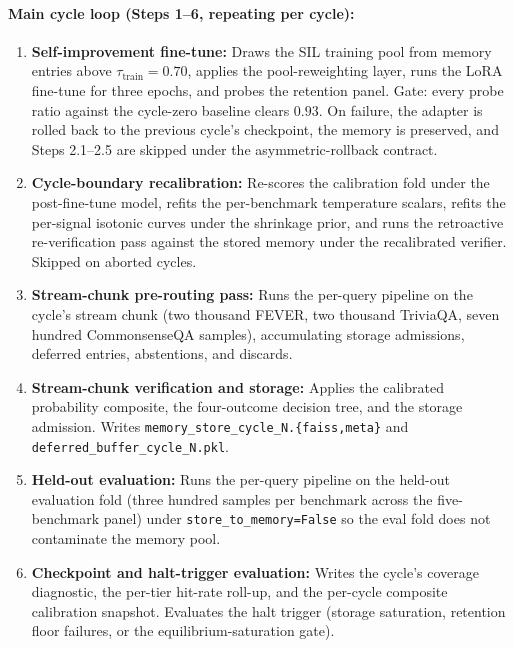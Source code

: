 \paragraph{Main cycle loop (Steps 1--6, repeating per cycle):}
\begin{enumerate}
\item \textbf{Self-improvement fine-tune:} Draws the SIL training pool from memory entries above $\tau_{\text{train}} = 0.70$, applies the pool-reweighting layer, runs the LoRA fine-tune for three epochs, and probes the retention panel. Gate: every probe ratio against the cycle-zero baseline clears $0.93$. On failure, the adapter is rolled back to the previous cycle's checkpoint, the memory is preserved, and Steps 2.1--2.5 are skipped under the asymmetric-rollback contract.
\item \textbf{Cycle-boundary recalibration:} Re-scores the calibration fold under the post-fine-tune model, refits the per-benchmark temperature scalars, refits the per-signal isotonic curves under the shrinkage prior, and runs the retroactive re-verification pass against the stored memory under the recalibrated verifier. Skipped on aborted cycles.
\item \textbf{Stream-chunk pre-routing pass:} Runs the per-query pipeline on the cycle's stream chunk (two thousand FEVER, two thousand TriviaQA, seven hundred CommonsenseQA samples), accumulating storage admissions, deferred entries, abstentions, and discards.
\item \textbf{Stream-chunk verification and storage:} Applies the calibrated probability composite, the four-outcome decision tree, and the storage admission. Writes \verb|memory_store_cycle_N.{faiss,meta}| and \verb|deferred_buffer_cycle_N.pkl|.
\item \textbf{Held-out evaluation:} Runs the per-query pipeline on the held-out evaluation fold (three hundred samples per benchmark across the five-benchmark panel) under \verb|store_to_memory=False| so the eval fold does not contaminate the memory pool.
\item \textbf{Checkpoint and halt-trigger evaluation:} Writes the cycle's coverage diagnostic, the per-tier hit-rate roll-up, and the per-cycle composite calibration snapshot. Evaluates the halt trigger (storage saturation, retention floor failures, or the equilibrium-saturation gate).
\end{enumerate}

